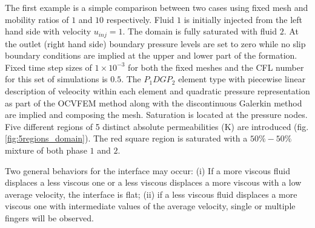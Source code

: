 \documentclass[preprint,authoryear,12pt]{elsarticle}
\begin{document}
\medskip
The first example is a simple comparison between two cases using fixed mesh and mobility ratios of $1$ and $10$ respectively. 
Fluid $1$ is initially injected from the left hand side with velocity $u_{inj}=1$. The domain is fully saturated with fluid $2$. At the outlet (right hand side) boundary pressure levels are set to zero while no slip boundary conditions are implied at the upper and lower part of the formation. Fixed time step sizes of $1 \times 10^{-3}$ for both the fixed meshes and the CFL number for this set of simulations is $0.5$. The $P_{1}DGP_{2}$ element type with piecewise linear description of veleocity within each element and quadratic pressure representation as part of the OCVFEM method along with the discontinuous Galerkin method are implied and composing the mesh. Saturation is located at the pressure nodes. Five different regions of 5 distinct absolute permeabilities (K) are introduced (fig.\ref{fig:5regions_domain}). The red square region is saturated with a $50\%-50\%$ mixture of both phase $1$ and $2$. 

\medskip
Two general behaviors for the interface may occur: (i) If a more viscous fluid displaces a less viscous one or a less viscous displaces a more viscous with a low average velocity, the interface is flat; (ii) if a less viscous fluid displaces a more viscous one with intermediate values of the average velocity, single or multiple fingers will be observed.
\end{document}
